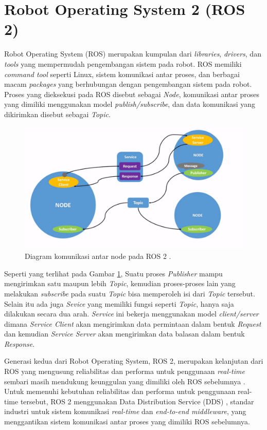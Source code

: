 \section{Robot Operating System 2 (ROS 2)}
\label{sec:robotoperatingsystem}

Robot Operating System (ROS) \citep{cit:quigley2009} merupakan kumpulan dari \emph{libraries}, \emph{drivers}, dan \emph{tools} yang mempermudah pengembangan sistem pada robot.
ROS memiliki \emph{command tool} seperti Linux, sistem komunikasi antar proses, dan berbagai macam \emph{packages} yang berhubungan dengan pengembangan sistem pada robot.
Proses yang dieksekusi pada ROS disebut sebagai \emph{Node}, komunikasi antar proses yang dimiliki menggunakan model \emph{publish/subscribe}, dan data komunikasi yang dikirimkan disebut sebagai \emph{Topic}.

\begin{figure} [ht]
  \centering
	\includegraphics[scale=0.4]{gambar/komunikasi-ros.png}
	\caption{Diagram komunikasi antar node pada ROS 2 \citep{url:ros2nodes}.}
	\label{fig:komunikasiros}
\end{figure}

Seperti yang terlihat pada Gambar \ref{fig:komunikasiros}, Suatu proses \emph{Publisher} mampu mengirimkan satu maupun lebih \emph{Topic}, kemudian proses-proses lain yang melakukan \emph{subscribe} pada suatu \emph{Topic} bisa memperoleh isi dari \emph{Topic} tersebut.
Selain itu ada juga \emph{Sevice} yang memiliki fungsi seperti \emph{Topic}, hanya saja dilakukan secara dua arah.
\emph{Service} ini bekerja menggunakan model \emph{client/server} dimana \emph{Service Client} akan mengirimkan data permintaan dalam bentuk \emph{Request} dan kemudian \emph{Service Server} akan mengirimkan data balasan dalam bentuk \emph{Response}.

Generasi kedua dari Robot Operating System, ROS 2, merupakan kelanjutan dari ROS yang mengusung reliabilitas dan performa untuk penggunaan \emph{real-time} sembari masih mendukung keunggulan yang dimiliki oleh ROS sebelumnya \citep{cit:maruyama2016}.
Untuk memenuhi kebutuhan reliabilitas dan performa untuk penggunaan real-time tersebut, ROS 2 menggunakan Data Distribution Service (DDS) \citep{cit:castellote2003} \citep{cit:schlesselman2004}, standar industri untuk sistem komunikasi \emph{real-time} dan \emph{end-to-end middleware}, yang menggantikan sistem komunikasi antar proses yang dimiliki ROS sebelumnya.
